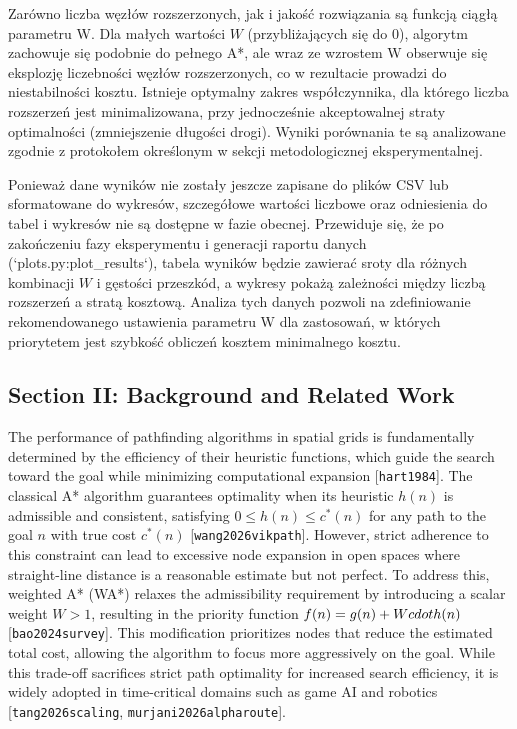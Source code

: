 Zarówno liczba węzłów rozszerzonych, jak i jakość rozwiązania są funkcją ciągłą parametru W. Dla małych wartości $W$ (przybliżających się do 0), algorytm zachowuje się podobnie do pełnego A*, ale wraz ze wzrostem W obserwuje się eksplozję liczebności węzłów rozszerzonych, co w rezultacie prowadzi do niestabilności kosztu. Istnieje optymalny zakres współczynnika, dla którego liczba rozszerzeń jest minimalizowana, przy jednocześnie akceptowalnej straty optimalności (zmniejszenie długości drogi). Wyniki porównania te są analizowane zgodnie z protokołem określonym w sekcji metodologicznej eksperymentalnej.

Ponieważ dane wyników nie zostały jeszcze zapisane do plików CSV lub sformatowane do wykresów, szczegółowe wartości liczbowe oraz odniesienia do tabel i wykresów nie są dostępne w fazie obecnej. Przewiduje się, że po zakończeniu fazy eksperymentu i generacji raportu danych (`plots.py:plot_results`), tabela wyników będzie zawierać sroty dla różnych kombinacji $W$ i gęstości przeszkód, a wykresy pokażą zależności między liczbą rozszerzeń a stratą kosztową. Analiza tych danych pozwoli na zdefiniowanie rekomendowanego ustawienia parametru W dla zastosowań, w których priorytetem jest szybkość obliczeń kosztem minimalnego kosztu.

\subsection{Section II: Background and Related Work}
The performance of pathfinding algorithms in spatial grids is fundamentally determined by the efficiency of their heuristic functions, which guide the search toward the goal while minimizing computational expansion [\texttt{hart1984}]. The classical A* algorithm guarantees optimality when its heuristic $h(n)$ is admissible and consistent, satisfying $0 \le h(n) \le c^*(n)$ for any path to the goal $n$ with true cost $c^*(n)$ [\texttt{wang2026vikpath}]. However, strict adherence to this constraint can lead to excessive node expansion in open spaces where straight-line distance is a reasonable estimate but not perfect. To address this, weighted A* (WA*) relaxes the admissibility requirement by introducing a scalar weight $W > 1$, resulting in the priority function $f(n) = g(n) + W \\cdot h(n)$ [\texttt{bao2024survey}]. This modification prioritizes nodes that reduce the estimated total cost, allowing the algorithm to focus more aggressively on the goal. While this trade-off sacrifices strict path optimality for increased search efficiency, it is widely adopted in time-critical domains such as game AI and robotics [\texttt{tang2026scaling}, \texttt{murjani2026alpharoute}].

